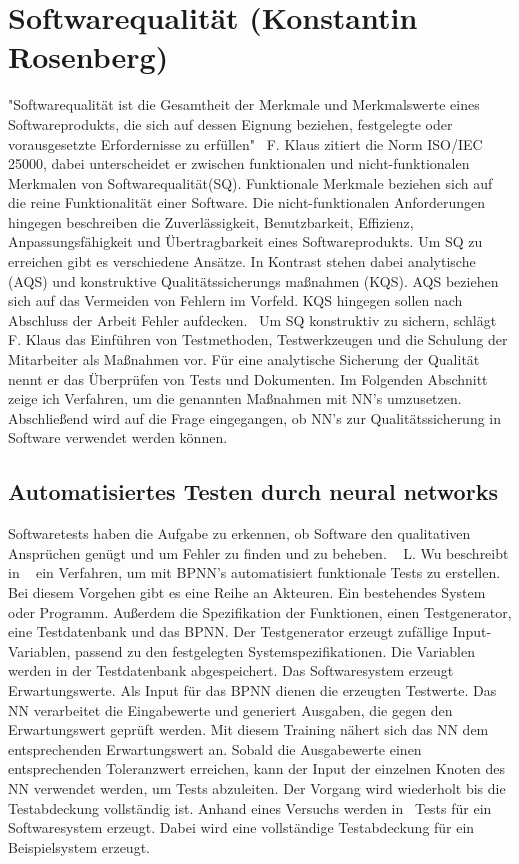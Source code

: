 \section{Softwarequalität (Konstantin Rosenberg)} \label{SQ}
"Softwarequalität ist die Gesamtheit der Merkmale und Merkmalswerte eines Softwareprodukts, die sich auf dessen Eignung beziehen,
festgelegte oder vorausgesetzte
Erfordernisse zu erfüllen"~\cite[p.~20]{Franz2015}
F. Klaus zitiert die Norm ISO/IEC 25000, dabei unterscheidet er zwischen funktionalen und nicht-funktionalen Merkmalen von Softwarequalität(SQ).
Funktionale Merkmale beziehen sich auf die reine Funktionalität einer Software. Die nicht-funktionalen Anforderungen hingegen beschreiben die Zuverlässigkeit, Benutzbarkeit, Effizienz, Anpassungsfähigkeit und Übertragbarkeit eines Softwareprodukts.
Um SQ zu erreichen gibt es verschiedene Ansätze. In Kontrast stehen dabei analytische (AQS) und konstruktive Qualitätssicherungs
maßnahmen (KQS). AQS beziehen sich auf das Vermeiden von Fehlern im Vorfeld. KQS hingegen sollen nach Abschluss der Arbeit Fehler aufdecken.~\cite[p.~29]{Franz2015} 
Um SQ konstruktiv zu sichern, schlägt F. Klaus das Einführen von Testmethoden, Testwerkzeugen und die Schulung der Mitarbeiter als Maßnahmen vor. Für eine analytische Sicherung der Qualität nennt er das Überprüfen von Tests und Dokumenten.
Im Folgenden Abschnitt zeige ich Verfahren, um die genannten Maßnahmen mit NN's umzusetzen. Abschließend wird auf die Frage eingegangen, ob NN's zur Qualitätssicherung in Software verwendet werden können.

\subsection{Automatisiertes Testen durch neural networks}
Softwaretests haben die Aufgabe zu erkennen, ob Software den qualitativen Ansprüchen genügt und um Fehler zu finden und zu beheben. ~\cite{Wu2008}
L. Wu beschreibt in ~\cite{Wu2008} ein Verfahren, um mit BPNN's automatisiert funktionale Tests zu erstellen. 
Bei diesem Vorgehen gibt es eine Reihe an Akteuren. Ein bestehendes System oder Programm. Außerdem die Spezifikation der Funktionen, einen Testgenerator, eine Testdatenbank und das BPNN. Der Testgenerator erzeugt zufällige Input-Variablen, passend zu den festgelegten Systemspezifikationen. Die Variablen werden in der Testdatenbank abgespeichert. Das Softwaresystem erzeugt Erwartungswerte. Als Input für das BPNN dienen die erzeugten Testwerte. Das NN verarbeitet die Eingabewerte und generiert Ausgaben, die gegen den Erwartungswert geprüft werden.
Mit diesem Training nähert sich das NN dem entsprechenden Erwartungswert an.
Sobald die Ausgabewerte einen entsprechenden Toleranzwert erreichen, kann der Input der einzelnen Knoten des NN verwendet werden, um Tests abzuleiten. Der Vorgang wird wiederholt bis die Testabdeckung vollständig ist. Anhand eines Versuchs werden in~\cite{Wu2008} Tests für ein Softwaresystem erzeugt. Dabei wird eine vollständige Testabdeckung für ein Beispielsystem erzeugt.\\

